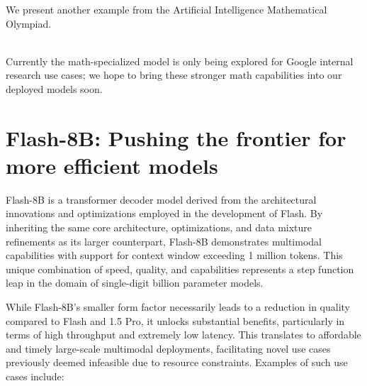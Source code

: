 We present another example from the Artificial Intelligence Mathematical Olympiad.

\\

Currently the math-specialized model is only being explored for Google internal research use cases; we hope to bring these stronger math capabilities into our deployed models soon.

\section{Flash-8B: Pushing the frontier for more efficient models}
\label{sec:flash8b-section}

Flash-8B is a transformer decoder model derived from the architectural innovations and optimizations employed in the development of Flash. By inheriting the same core architecture, optimizations, and data mixture refinements as its larger counterpart, Flash-8B demonstrates  multimodal capabilities with support for context window exceeding 1 million tokens. This unique combination of speed, quality, and capabilities represents a step function leap in the domain of single-digit billion parameter models.

While Flash-8B's smaller form factor necessarily leads to a reduction in quality compared to Flash and 1.5 Pro, it unlocks substantial benefits, particularly in terms of high throughput and extremely low latency. This translates to affordable and timely large-scale multimodal deployments, facilitating novel use cases previously deemed infeasible due to resource constraints. Examples of such use cases include:

